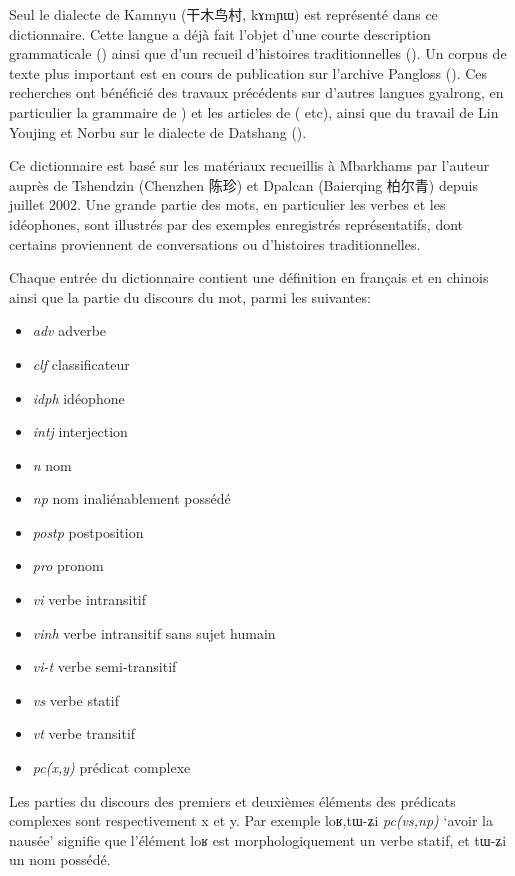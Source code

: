\documentclass[oldfontcommands,oneside,a4paper,11pt]{article}
\newcommand{\ipa}[1]{{\phon #1}} %
\newcommand{\zh}[1]{{\cn #1}}
\begin{document}
Seul le dialecte de Kamnyu (\zh{干木鸟村}, \ipa{kɤmɲɯ}) est représenté dans ce dictionnaire. Cette langue a déjà fait l'objet d'une courte description grammaticale (\citealt{jacques08}) ainsi que d'un recueil d'histoires traditionnelles (\citealt{jacques10gesar}). Un corpus de texte plus important est en cours de publication sur l'archive Pangloss (\citealt{michailovsky14pangloss}). Ces recherches ont bénéficié des travaux précédents sur d'autres langues gyalrong, en particulier la grammaire de \citet{linxr93jiarong}) et les articles de (\citealt{jackson00sidaba, jackson04zhuangmaoci, jackson06paisheng, jackson14morpho} etc), ainsi que du travail de Lin Youjing et Norbu sur le dialecte de Datshang (\citealt{linluo03}).

Ce dictionnaire est basé sur les matériaux recueillis à Mbarkhams par l'auteur auprès de Tshendzin (Chenzhen \zh{陈珍}) et Dpalcan (Baierqing \zh{柏尔青}) depuis juillet 2002. Une grande partie des mots, en particulier les verbes et les idéophones, sont illustrés par des exemples enregistrés représentatifs, dont certains proviennent de conversations ou d'histoires traditionnelles.

Chaque entrée du dictionnaire contient une définition en français et en chinois ainsi que la partie du discours du mot, parmi les suivantes:

\begin{itemize}
\item \textit{adv} adverbe
\item \textit{clf} classificateur
\item \textit{idph} idéophone
\item \textit{intj} interjection
\item \textit{n} nom
\item \textit{np} nom inaliénablement possédé 
\item \textit{postp} postposition
\item \textit{pro} pronom
\item \textit{vi} verbe intransitif
\item \textit{vinh} verbe intransitif sans sujet humain
\item \textit{vi-t} verbe semi-transitif
\item \textit{vs} verbe statif
\item \textit{vt} verbe transitif
\item \textit{pc(x,y)} prédicat complexe 
\end{itemize}

Les parties du discours des premiers et deuxièmes éléments des prédicats complexes sont respectivement \ipa{x} et \ipa{y}. Par exemple \ipa{loʁ,tɯ-ʑi} \textit{pc(vs,np)} `avoir la nausée' signifie que l'élément \ipa{loʁ} est morphologiquement un verbe statif, et \ipa{tɯ-ʑi} un nom possédé.
\end{document}
